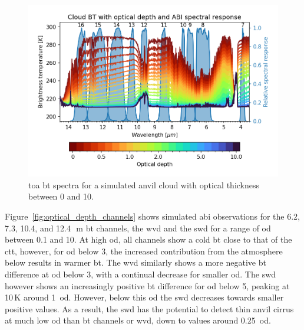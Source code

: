 \begin{figure}[tp]
    \includegraphics[width=\textwidth]{figures/chapter1_08.png}
    \caption[
    \acrshort{toa} \acrshort{bt} spectra for a simulated anvil cloud with optical thickness between 0 and 10
    ]{
    \acrshort{toa} \acrshort{bt} spectra for a simulated anvil cloud with optical thickness between 0 and 10. 
    }
    \label{fig:optical_depth_spectra}
\end{figure}


Figure~\ref{fig:optical_depth_channels} shows simulated \acrshort{abi} observations for the 6.2, 7.3, 10.4, and 12.4\,\unit{\mu m} \acrshort{bt} channels, the \acrshort{wvd} and the \acrshort{swd} for a range of \acrshort{od} between 0.1 and 10.
At high \acrshort{od}, all channels show a cold \acrshort{bt} close to that of the \acrshort{ctt}, however, for \acrshort{od} below 3, the increased contribution from the atmosphere below results in warmer \acrshort{bt}.
The \acrshort{wvd} similarly shows a more negative \acrshort{bt} difference at \acrshort{od} below 3, with a continual decrease for smaller \acrshort{od}.
The \acrshort{swd} however shows an increasingly positive \acrshort{bt} difference for \acrshort{od} below 5, peaking at 10\,\unit{K} around 1~\acrshort{od}.
However, below this \acrshort{od} the \acrshort{swd} decreases towards smaller positive values.
As a result, the \acrshort{swd} has the potential to detect thin anvil cirrus at much low \acrshort{od} than \acrshort{bt} channels or \acrshort{wvd}, down to values around 0.25~\acrfull{od}.


